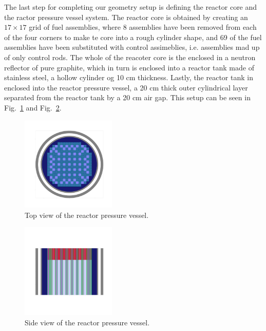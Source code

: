 \documentclass[twocolumn,a4paper,10pt]{article}
\begin{document}
\par
The last step for completing our geometry setup is defining the reactor core and the ractor pressure vessel system. The reactor core is obtained by creating an $17 \times 17$ grid of fuel assemblies, where 8 assemblies have been removed from each of the four corners to make te core into a rough cylinder shape, and 69 of the fuel assemblies have been substituted with control assimeblies, i.e. assemblies mad up of only control rods. The whole of the reacoter core is the enclosed in a neutron reflector of pure graphite, which in turn is enclosed into a reactor tank made of stainless steel, a hollow cylinder og 10 cm thickness. Lastly, the reactor tank in enclosed into the reactor pressure vessel, a 20 cm thick outer cylindrical layer separated from the reactor tank by a 20 cm air gap. This setup can be seen in Fig.~\ref{fig:RPV_xy} and Fig.~\ref{fig:RPV_yz}. 

\begin{figure}[ht]
  \centering
  \includegraphics[width=0.4\textwidth]{../Pictures/RPV_Universe_plot_xy.png}
  \caption{Top view of the reactor pressure vessel.}
  \label{fig:RPV_xy}
\end{figure}

\begin{figure}[ht]
  \centering
  \includegraphics[width=0.4\textwidth]{../Pictures/RPV_Universe_plot_yz.png}
  \caption{Side view of the reactor pressure vessel.}
  \label{fig:RPV_yz}
\end{figure}
\end{document}
